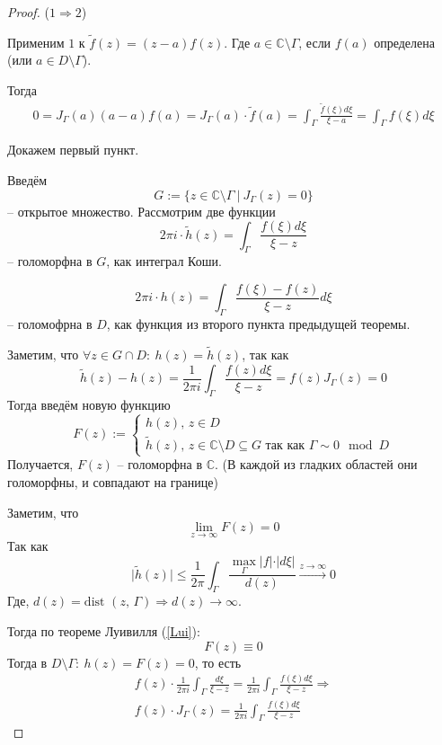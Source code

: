 \documentclass[a4paper,12pt]{article}
\renewcommand{\leq}{\ensuremath{\leqslant}}
\theoremstyle{plain}
\theoremstyle{definition}
\theoremstyle{remark}
\begin{document}
\begin{proof}
	($1 \Rightarrow 2$)

	Применим $1$ к $\tilde{f}(z) = (z - a)f(z)$. Где $a \in \mathbb{C} \setminus \Gamma$, если $f(a)$ определена (или $a \in D \setminus \Gamma$).

	Тогда
	\begin{align*}
		0 = J_\Gamma(a)(a - a)f(a) = J_\Gamma(a)\cdot\tilde{f}(a) = \int_\Gamma\frac{\tilde{f}(\xi)d\xi}{\xi - a} = \int_\Gamma f(\xi)d\xi
	\end{align*}

	Докажем первый пункт.

	Введём
	\[
		G := \{z \in \mathbb{C} \setminus \Gamma \:\vert\: J_\Gamma(z) = 0\}
	\]
	-- открытое множество. Рассмотрим две функции
	\[
		2\pi i \cdot\tilde{h}(z) = \int_\Gamma\frac{f(\xi)d\xi}{\xi - z}
	\]
	-- голоморфна в $G$, как интеграл Коши.

	\[
		2\pi i\cdot h(z) = \int_\Gamma\frac{f(\xi) - f(z)}{\xi - z}d\xi
	\]
	-- голомофрна в $D$, как функция из второго пункта предыдущей теоремы.

	Заметим, что $\forall z \in G \cap D :\: h(z) = \tilde{h}(z)$, так как
	\[
		\tilde{h}(z) - h(z) = \frac{1}{2\pi i}\int_\Gamma \frac{f(z)d\xi}{\xi - z} = f(z)J_\Gamma(z) = 0
	\]
	Тогда введём новую функцию
	\[
		F(z) := \begin{cases}
			h(z),\, z \in D \\
			\tilde{h}(z),\, z \in \mathbb{C}\setminus D \subseteq G \text{ так как } \Gamma \sim 0 \mod D
		\end{cases}
	\]
	Получается, $F(z)$ -- голоморфна в $\mathbb{C}$. (В каждой из гладких областей они голоморфны, и совпадают на границе)

	Заметим, что
	\[
		\lim_{z \to \infty} F(z) = 0
	\]
	Так как
	\[
		\vert\tilde{h}(z)\vert \leq \frac{1}{2\pi}\int_\Gamma\frac{\max_\Gamma \vert f\vert\cdot\vert d\xi\vert}{d(z)} \overset{z \to \infty}{\to} 0
	\]
	Где, $d(z) = \text{dist }(z,\, \Gamma) \Rightarrow d(z) \to \infty$.

	Тогда по теореме Луивилля (\ref{Lui}):
	\[
		F(z) \equiv 0
	\]
	Тогда в $D \setminus \Gamma :\: h(z) = F(z) = 0$, то есть
	\begin{align*}
		f(z)\cdot\frac{1}{2\pi i}\int_{\Gamma}\frac{d\xi}{\xi - z} = \frac{1}{2\pi i}\int_\Gamma\frac{f(\xi)d\xi}{\xi - z} \Rightarrow \\
		f(z)\cdot J_\Gamma(z) =  \frac{1}{2\pi i}\int_\Gamma\frac{f(\xi)d\xi}{\xi - z}
	\end{align*}
\end{proof}
\end{document}
